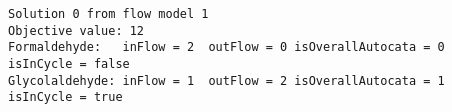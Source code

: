 \begin{verbatim}
Solution 0 from flow model 1
Objective value: 12
Formaldehyde:	inFlow = 2	outFlow = 0	isOverallAutocata = 0	isInCycle = false
Glycolaldehyde:	inFlow = 1	outFlow = 2	isOverallAutocata = 1	isInCycle = true
\end{verbatim}
